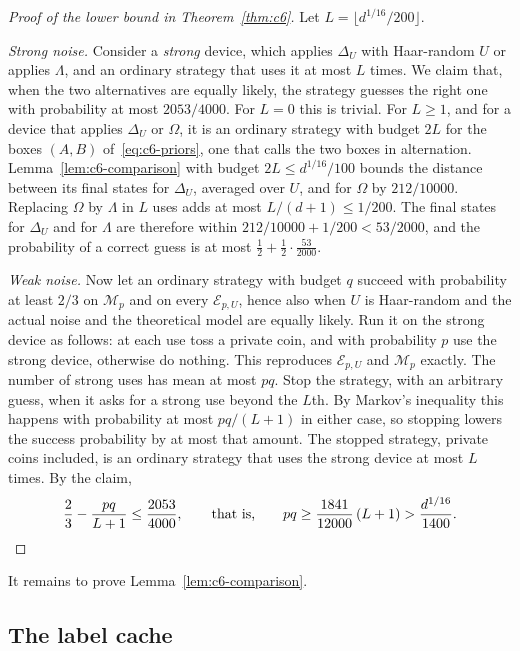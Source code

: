 \documentclass[11pt,letterpaper]{article}
\theoremstyle{definition}\newtheorem{definition}[theorem]{Definition}
\begin{document}
\begin{proof}[Proof of the lower bound in Theorem~\ref{thm:c6}]
Let $L=\lfloor d^{1/16}/200\rfloor$.

\emph{Strong noise.} Consider a \emph{strong} device, which applies
$\Delta_U$ with Haar-random $U$ or applies $\Lambda$, and an ordinary
strategy that uses it at most $L$ times. We claim that, when the two
alternatives are equally likely, the strategy guesses the right one
with probability at most $2053/4000$. For $L=0$ this is trivial. For
$L\ge1$, and for a device that applies $\Delta_U$ or $\Omega$, it is an
ordinary strategy with budget $2L$ for the boxes $(A,B)$
of~\eqref{eq:c6-priors}, one that calls the two boxes in alternation.
Lemma~\ref{lem:c6-comparison} with budget $2L\le d^{1/16}/100$ bounds
the distance between its final states for $\Delta_U$, averaged over
$U$, and for $\Omega$ by $212/10000$. Replacing $\Omega$ by $\Lambda$
in $L$ uses adds at most $L/(d+1)\le1/200$. The final states for
$\Delta_U$ and for $\Lambda$ are therefore within
$212/10000+1/200<53/2000$, and the probability of a correct guess is at
most $\frac12+\frac12\cdot\frac{53}{2000}$.

\emph{Weak noise.} Now let an ordinary strategy with budget $q$ succeed
with probability at least $2/3$ on $\mathcal M_p$ and on every
$\mathcal E_{p,U}$, hence also when $U$ is Haar-random and the actual noise and
the theoretical model are equally likely. Run it on the strong device as follows: at
each use toss a private coin, and with probability $p$ use the strong
device, otherwise do nothing. This reproduces $\mathcal E_{p,U}$ and
$\mathcal M_p$ exactly. The number of strong uses has mean at most
$pq$. Stop the strategy, with an arbitrary guess, when it asks for a strong
use beyond the $L$th. By Markov's inequality this happens with probability at most
$pq/(L+1)$ in either case, so stopping lowers the success probability
by at most that amount. The stopped strategy, private coins included,
is an ordinary strategy that uses the strong device at most $L$ times.
By the claim,
\[
  \frac23-\frac{pq}{L+1}\le\frac{2053}{4000},
 \qquad\text{that is,}\qquad
 pq\ge\frac{1841}{12000}\,(L+1)>\frac{d^{1/16}}{1400}. \qedhere
\]
\end{proof}

It remains to prove Lemma~\ref{lem:c6-comparison}.

\subsection{The label cache}\label{sec:cache}
\end{document}
